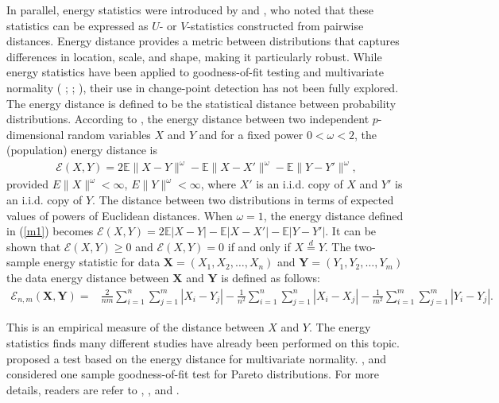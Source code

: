 \documentclass[11pt]{article}
\numberwithin{theorem}{section}
\numberwithin{Lemma}{section}
\numberwithin{Definition}{section}
\begin{document}
In parallel, energy statistics were introduced by \cite{sze2000} and \cite{sze2013}, who noted that these statistics can be expressed as $U$- or $V$-statistics constructed from pairwise distances. Energy distance provides a metric between distributions that captures differences in location, scale, and shape, making it particularly robust. While energy statistics have been applied to goodness-of-fit testing and multivariate normality ( \cite{sze2004}; \cite{sze2004}; \cite{sze20051}), their use in change-point detection has not been fully explored. The energy distance is defined to be the statistical distance between probability distributions. According to \cite{sze2013}, the energy distance between two independent $p$-dimensional random variables $X$ and $Y$ and for a fixed power $0<\omega<2$, the (population) energy distance is
\begin{equation}\label{m1}
\begin{aligned}
\mathcal{E}(X,Y) = 2\mathbb{E}\|X - Y\|^\omega - \mathbb{E}\|X - X'\|^\omega - \mathbb{E}\|Y - Y'\|^\omega, 
\end{aligned}
\end{equation}
provided $E\|X\|^{\omega} < \infty$, $E\|Y\|^{\omega} < \infty$, where $X'$ is an i.i.d. copy of $X$ and $Y'$ is an i.i.d. copy of $Y$. The distance between two distributions in terms of expected values of powers of Euclidean distances. When $\omega = 1$, the energy distance defined in (\ref{m1}) becomes $\mathcal{E}(X,Y) = 2\mathbb{E}|X - Y| - \mathbb{E}|X - X'| - \mathbb{E}|Y - Y'|$. It can be shown that $\mathcal{E}(X,Y) \geq 0$ and $\mathcal{E}(X,Y) = 0$ if and only if $X \stackrel{\text{$d$}}{=} Y$. The two-sample energy statistic for data $\mathbf{X}=\left(X_1, X_2, \ldots, X_n\right)$ and $\mathbf{Y}=\left(Y_1, Y_2, \ldots, Y_m\right)$ the data energy distance between $\mathbf{X}$ and $\mathbf{Y}$ is defined as follows:
\begin{equation}\label{m2}
\begin{aligned}
\mathcal{E}_{n, m}(\mathbf{X}, \mathbf{Y})= & \frac{2}{n m} \sum_{i=1}^n \sum_{j=1}^m\left|X_i-Y_j\right|  -\frac{1}{n^2} \sum_{i=1}^n \sum_{j=1}^n\left|X_i-X_j\right|-\frac{1}{m^2} \sum_{i=1}^m \sum_{j=1}^m\left|Y_i-Y_j\right|.
\end{aligned}
\end{equation}


This is an empirical measure of the distance between $X$ and $Y$. The energy statistics finds many different studies have already been performed on this topic. \cite{sze20051}  proposed a test based on the energy distance for multivariate normality. \cite{rizzo2009},  and \cite{rizzo2016} considered one sample goodness-of-fit test for Pareto distributions. For more details, readers are refer to \cite{sze2004}, \cite{sze2007}, \cite{sze20051} and \cite{sze20052}.\\
\end{document}
